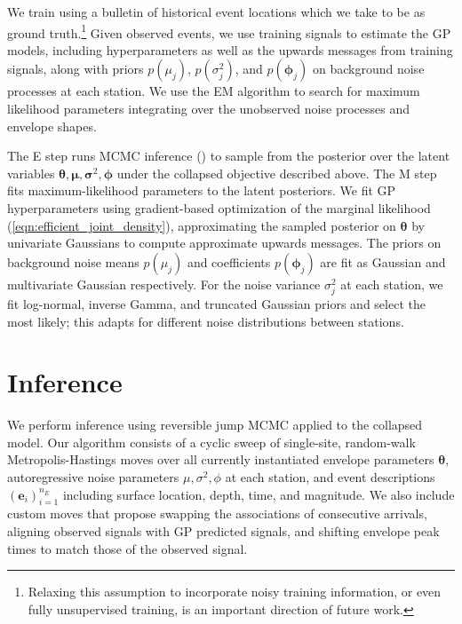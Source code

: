 \documentclass[twoside]{article} \usepackage{aistats2017}
\renewcommand{\v}[1]{\mathbf{#1}}
\newcommand{\todo}[1]{{\color{red} \textbf{TODO:} {#1}}}
\begin{document}
We train using a bulletin of historical event locations which
we take to be as ground truth.\footnote{Relaxing this assumption to incorporate noisy training
  information, or even fully unsupervised training, is an important
  direction of future work.} Given observed events, we use
training signals to estimate the GP models, including hyperparameters as well as the
  upwards messages from training signals, along with priors
  $p(\mu_j)$, $p(\sigma^2_j)$, and $p(\v{\phi}_j)$ on background
  noise processes at each station. We use the EM algorithm
  \citep{dempster1977maximum} to search for maximum likelihood parameters integrating over
  the unobserved noise processes and envelope shapes. 

  The E step runs MCMC inference () to sample from
  the posterior over the latent variables
  $\v{\theta}, \v{\mu}, \v{\sigma}^2, \v{\phi}$ under the collapsed
  objective described above. The M step fits maximum-likelihood
  parameters to the latent posteriors. We fit GP hyperparameters using
  gradient-based optimization of the marginal likelihood
  (\ref{eqn:efficient_joint_density}), approximating the sampled
  posterior on $\v{\theta}$ by univariate Gaussians to compute
  approximate upwards messages. The priors on background noise means
  $p(\mu_j)$ and coefficients $p(\v{\phi}_j)$ are fit as Gaussian and
  multivariate Gaussian respectively. For the noise variance
  $\sigma^2_j$ at each station, we fit log-normal, inverse Gamma, and
  truncated Gaussian priors and select the most likely; this adapts
  for different noise distributions between stations.


\section{Inference}
\label{sec:inference}
We perform inference using reversible jump MCMC \citep{hastie2012model} applied
to the collapsed model. Our algorithm consists of a cyclic sweep of
single-site, random-walk Metropolis-Hastings moves over all currently
instantiated envelope parameters $\v{\theta}$, autoregressive noise
parameters $\mu, \sigma^2, \phi$ at each station, and event
descriptions $(\v{e}_i)_{i=1}^{n_E}$ including surface location,
depth, time, and magnitude. We also include custom
moves that propose swapping the associations of consecutive arrivals,
aligning observed signals with GP predicted signals,
and shifting envelope peak times to match those of the observed signal. 
\end{document}

